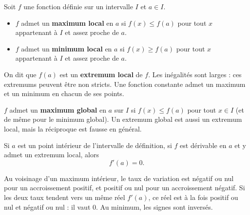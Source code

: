 


\begin{nxdef}
Soit $f$ une fonction définie sur un intervalle $I$ et $a \in I$.

\begin{itemize}
  \item $f$ admet un \textbf{maximum local} en $a$ si $f(x) \leq f(a)$ pour tout $x$
        appartenant à $I$ et assez proche de $a$.
  \item $f$ admet un \textbf{minimum local} en $a$ si $f(x) \geq f(a)$ pour tout $x$
        appartenant à $I$ et assez proche de $a$.
\end{itemize}

On dit que $f(a)$ est un \textbf{extremum local} de $f$. Les inégalités sont
larges : ces extremums peuvent être non stricts. Une fonction constante
admet un maximum et un minimum en chacun de ses points.
\end{nxdef}

\begin{nxdef}
$f$ admet un \textbf{maximum global} en $a$ sur $I$ si $f(x) \leq f(a)$ pour tout
$x \in I$ (et de même pour le minimum global). Un extremum global est aussi un
extremum local, mais la réciproque est fausse en général.
\end{nxdef}



\begin{nxthm}
Si $a$ est un point intérieur de l'intervalle de définition, si $f$ est
dérivable en $a$ et y admet un extremum local, alors
\[
  f'(a) = 0.
\]
\end{nxthm}

Au voisinage d'un maximum intérieur, le taux de variation est négatif ou nul
pour un accroissement positif, et positif ou nul pour un accroissement négatif.
Si les deux taux tendent vers un même réel $f'(a)$, ce réel est à la fois
positif ou nul et négatif ou nul : il vaut $0$. Au minimum, les signes sont inversés.

